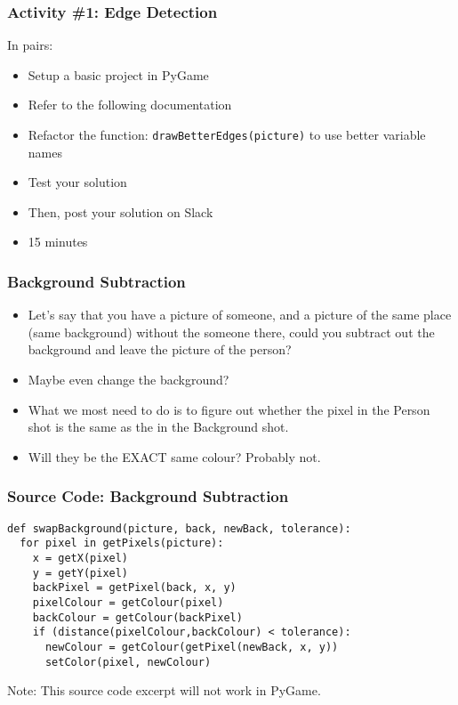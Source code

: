 
\begin{frame}
	\frametitle{Activity \#1: Edge Detection}
	
	In pairs:
	
	\vspace{2em}
	
	\begin{itemize}		
		\item Setup a basic project in PyGame
		\item Refer to the following documentation
		\item Refactor the function: \texttt{drawBetterEdges(picture)} to use better variable names
		\item Test your solution
		\item Then, post your solution on Slack
		\item 15 minutes
	\end{itemize}
\end{frame}

\begin{frame}
	\frametitle{Background Subtraction}
	
	\begin{itemize}		
		\item Let's say that you have a picture of someone, and a picture of the same place (same background) without the someone there,
		could you subtract out the background and leave the picture of the person?
		\item Maybe even change the background?
		\item What we most need to do is to figure out whether the pixel in the Person shot is the same as the in the Background shot.
		\item Will they be the EXACT same colour?  Probably not.
	\end{itemize}
\end{frame}

\begin{frame}[fragile]
	\frametitle{Source Code: Background Subtraction}
	
\begin{lstlisting}
def swapBackground(picture, back, newBack, tolerance):
  for pixel in getPixels(picture):
    x = getX(pixel)
    y = getY(pixel)
    backPixel = getPixel(back, x, y)
    pixelColour = getColour(pixel)
    backColour = getColour(backPixel)
    if (distance(pixelColour,backColour) < tolerance):
      newColour = getColour(getPixel(newBack, x, y))
      setColor(pixel, newColour)
\end{lstlisting}

Note: This source code excerpt will not work in PyGame.

\end{frame}

